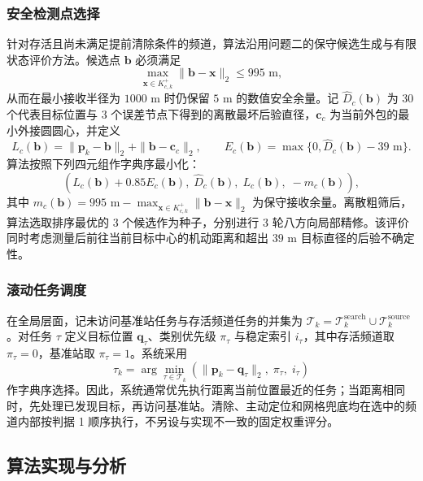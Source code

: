 \documentclass[zihao=-4,a4paper,UTF8]{ctexart}
\begin{document}
\subsubsection{安全检测点选择}
针对存活且尚未满足提前清除条件的频道，算法沿用问题二的保守候选生成与有限状态评价方法。候选点 $\mathbf b$ 必须满足
\begin{equation}
    \max_{\mathbf{x}\in K_{c,k}^+}\|\mathbf b-\mathbf x\|_2\le995\text{ m},
\end{equation}
从而在最小接收半径为 $1000\text{ m}$ 时仍保留 $5\text{ m}$ 的数值安全余量。记 $\widehat D_c(\mathbf b)$ 为 30 个代表目标位置与 3 个误差节点下得到的离散最坏后验直径，$\mathbf c_c$ 为当前外包的最小外接圆圆心，并定义
\begin{equation}
    L_c(\mathbf b)=\|\mathbf p_k-\mathbf b\|_2+\|\mathbf b-\mathbf c_c\|_2,
    \qquad
    E_c(\mathbf b)=\max\{0,\widehat D_c(\mathbf b)-39\text{ m}\}.
\end{equation}
算法按照下列四元组作字典序最小化：
\begin{equation}
    \left(
    L_c(\mathbf b)+0.85E_c(\mathbf b),\;
    \widehat D_c(\mathbf b),\;
    L_c(\mathbf b),\;
    -m_c(\mathbf b)
    \right),
\end{equation}
其中 $m_c(\mathbf b)=995\text{ m}-\max_{\mathbf{x}\in K_{c,k}^+}\|\mathbf b-\mathbf x\|_2$ 为保守接收余量。离散粗筛后，算法选取排序最优的 3 个候选作为种子，分别进行 3 轮八方向局部精修。该评价同时考虑测量后前往当前目标中心的机动距离和超出 $39\text{ m}$ 目标直径的后验不确定性。

\subsubsection{滚动任务调度}
在全局层面，记未访问基准站任务与存活频道任务的并集为 $\mathcal T_k=\mathcal T_k^{\mathrm{search}}\cup\mathcal T_k^{\mathrm{source}}$。对任务 $\tau$ 定义目标位置 $\mathbf q_\tau$、类别优先级 $\pi_\tau$ 与稳定索引 $i_\tau$，其中存活频道取 $\pi_\tau=0$，基准站取 $\pi_\tau=1$。系统采用
\begin{equation}
    \tau_k=\arg\min_{\tau\in\mathcal T_k}
    \left(\|\mathbf p_k-\mathbf q_\tau\|_2,\;\pi_\tau,\;i_\tau\right)
\end{equation}
作字典序选择。因此，系统通常优先执行距离当前位置最近的任务；当距离相同时，先处理已发现目标，再访问基准站。清除、主动定位和网格兜底均在选中的频道内部按判据 1 顺序执行，不另设与实现不一致的固定权重评分。

\subsection{算法实现与分析}
\end{document}

